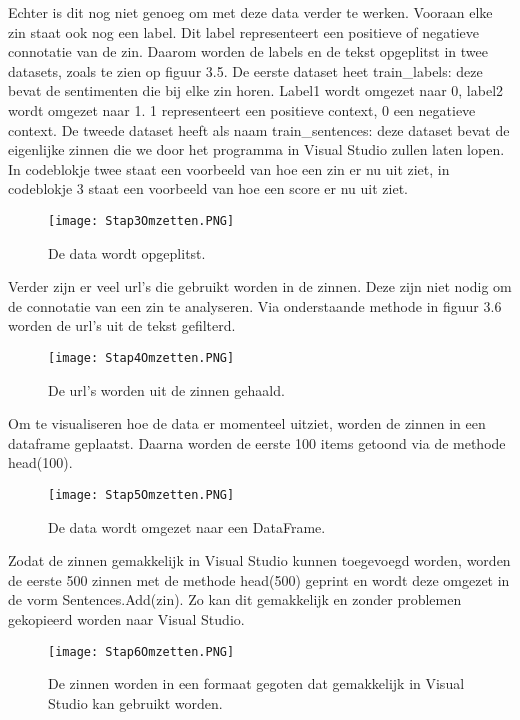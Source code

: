 Echter is dit nog niet genoeg om met deze data verder te werken. Vooraan elke zin staat ook nog een label. Dit label representeert een positieve of negatieve connotatie van de zin. Daarom worden de labels en de tekst opgeplitst in twee datasets, zoals te zien op figuur 3.5. De eerste dataset heet train\_labels: deze bevat de sentimenten die bij elke zin horen. Label1 wordt omgezet naar 0, label2 wordt omgezet naar 1. 1 representeert een positieve context, 0 een negatieve context. De tweede dataset heeft als naam train\_sentences: deze dataset bevat de eigenlijke zinnen die we door het programma in Visual Studio zullen laten lopen. In codeblokje twee staat een voorbeeld van hoe een zin er nu uit ziet, in codeblokje 3 staat een voorbeeld van hoe een score er nu uit ziet. 

\begin{figure}[!htbp]
    \texttt{[image: Stap3Omzetten.PNG]}
    \caption{\label{stap3amazon}De data wordt opgeplitst.}
\end{figure}
\FloatBarrier

Verder zijn er veel url's die gebruikt worden in de zinnen. Deze zijn niet nodig om de connotatie van een zin te analyseren. Via onderstaande methode in figuur 3.6 worden de url's uit de tekst gefilterd.

\begin{figure}[!htbp]
    \texttt{[image: Stap4Omzetten.PNG]}
    \caption{\label{stap4amazon}De url's worden uit de zinnen gehaald.}
\end{figure}
\FloatBarrier

Om te visualiseren hoe de data er momenteel uitziet, worden de zinnen in een dataframe geplaatst. Daarna worden de eerste 100 items getoond via de methode head(100).

\begin{figure}[!htbp]
    \texttt{[image: Stap5Omzetten.PNG]}
    \caption{\label{stap5amazon}De data wordt omgezet naar een DataFrame.}
\end{figure}
\FloatBarrier

Zodat de zinnen gemakkelijk in Visual Studio kunnen toegevoegd worden, worden de eerste 500 zinnen met de methode head(500) geprint en wordt deze omgezet in de vorm Sentences.Add(zin). Zo kan dit gemakkelijk en zonder problemen gekopieerd worden naar Visual Studio.

\begin{figure}[!htbp]
    \texttt{[image: Stap6Omzetten.PNG]}
    \caption{\label{stap6amazon}De zinnen worden in een formaat gegoten dat gemakkelijk in Visual Studio kan gebruikt worden.}
\end{figure}
\FloatBarrier

